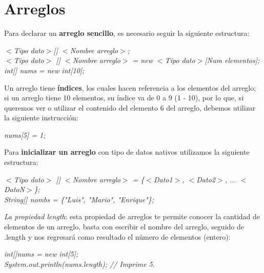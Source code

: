 \section{Arreglos}
\hspace{0.55cm}Para declarar un \textbf{arreglo sencillo}, es necesario seguir la siguiente estructura:
\begin{center}
    \textit{
        $<$Tipo dato$>$[] $<$Nombre arreglo$>$; \\
        $<$Tipo dato$>$ [] $<$Nombre arreglo$>$ = new $<$Tipo dato$>$[Num elementos]; \\
        int[] nums = new int[10];
    }
\end{center}

Un arreglo tiene \textbf{índices}, los cuales hacen referencia a los elementos del arreglo; si un arreglo tiene 10 elementos, su índice va de 0 a 9 (1 - 10), por lo que, si queremos ver o utilizar el contenido del elemento 6 del arreglo, debemos utilizar la siguiente instrucción:
\begin{center}
    \textit{nums[5] = 1;}
\end{center}

Para \textbf{inicializar un arreglo} con tipo de datos nativos utilizamos la siguiente estructura:
\begin{center}
    \textit{
        $<$Tipo dato$>$ [] $<$Nombre arreglo$>$ = \{$<$Dato1$>$, $<$Dato2$>$, ... $<$DatoN$>$\}; \\
        String[] nombs = \{"Luis", "Mario", "Enrique"\};
    }
\end{center}

\textit{La propiedad \textit{length}}: esta propiedad de arreglos te permite conocer la cantidad de elementos de un arreglo, basta con escribir el nombre del arreglo, seguido de .length y nos regresará como resultado el número de elementos (entero):
\begin{center}
    \textit{
        int[]nums = new int[5]; \\
        System.out.println(nums.length); // Imprime 5.
    }
\end{center}

